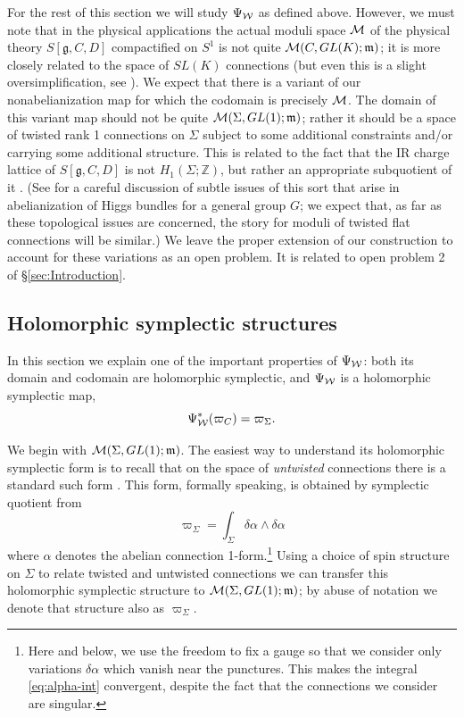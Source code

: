 \documentclass[11pt,a4paper]{article}
\def\Z{{\mathbb{Z}}}
\def\fg{\mathfrak{g}}
\def\CM {{\cal M}}
\def\wnet {{\cal W}}
\newcommand{\ti}[1]{\textit{#1}}
\def\fg{\mathfrak{g}}
\def\fm{\mathfrak{m}}
\def\CM {{\cal M}}
\def\wnet {{\cal W}}
\begin{document}
For the rest of this section we will study $\Psi_\wnet$ as defined above.
However, we must note that in the physical applications the actual
moduli space $\CM$ of the physical theory $S[\fg, C, D]$ compactified on $S^1$
is not quite $\CM(C, GL(K); \fm)$;
it is more closely related to the space of $SL(K)$ connections (but even
this is a slight oversimplification, see \cite{Gaiotto:2010be}).
We expect that there is a variant of our nonabelianization map
for which the codomain is precisely $\CM$.
The domain of this variant map should not be quite $\CM(\Sigma, GL(1); \fm)$;
rather it should be a space
of twisted rank 1 connections on $\Sigma$ subject to some additional constraints and/or
carrying some additional structure.  This is related to the fact that
the IR charge lattice of $S[\fg, C, D]$ is not $H_1(\Sigma;\Z)$, but rather an appropriate
subquotient of it \cite{Gaiotto:2009hg}.  (See \cite{MR1397059,dongaits}
for a careful discussion of subtle
issues of this sort that arise
in abelianization of Higgs bundles for a general group $G$; we expect that, as far as
these topological issues are concerned, the story for moduli of twisted
flat connections will be similar.) We leave the proper extension of our construction
to account for these variations as an open problem. It is related to open problem 2
of \S \ref{sec:Introduction}.



\subsection{Holomorphic symplectic structures} \label{sec:hol-symp}

In this section we explain one of the important properties of $\Psi_\wnet$:
both its domain and codomain are holomorphic symplectic, and $\Psi_\wnet$ is a
holomorphic symplectic map,
\begin{equation}\label{eq:preserve-sf}
\Psi_{\wnet}^*(\varpi_C) = \varpi_{\Sigma}.
\end{equation}

We begin with $\CM(\Sigma, GL(1); \mathfrak{m})$.  The easiest way to understand
its holomorphic symplectic form is to recall that on the space of \ti{untwisted} connections
there is a standard such form \cite{MR85k:14006,boalch-thesis}.  This form, formally speaking, is
obtained by symplectic quotient from
\begin{equation} \label{eq:alpha-int}
\varpi_{\Sigma} = \int_{\Sigma} \delta \alpha \wedge \delta \alpha
\end{equation}
where $\alpha$ denotes the abelian connection 1-form.\footnote{Here and below,
we use the freedom to fix a gauge
so that we consider only variations $\delta \alpha$ which vanish near the punctures.
This makes  the integral \eqref{eq:alpha-int}
  convergent, despite the fact that the connections we consider are singular.}
Using a choice of spin structure on $\Sigma$ to relate twisted and untwisted connections
we can transfer this holomorphic symplectic structure to
$\CM(\Sigma, GL(1); \mathfrak{m})$; by abuse of notation we denote that structure
also as $\varpi_\Sigma$.
\end{document}
